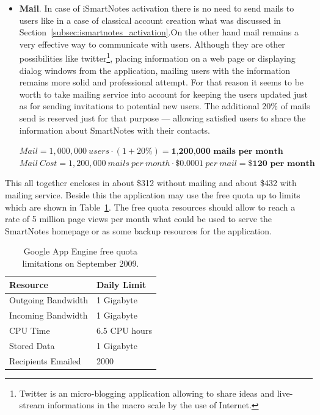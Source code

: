 \begin{itemize}
\item{\textbf{Mail}. In case of iSmartNotes activation there is no need to send mails to users like in a case of classical account creation what was discussed in Section~\ref{subsec:ismartnotes_activation}.On the other hand mail remains a very effective way to communicate with users. Although they are other possibilities like twitter\footnote{Twitter is an micro-blogging application allowing to share ideas and live-stream informations in the macro scale by the use of Internet.}, placing information on a web page or displaying dialog windows from the application, mailing users with the information remains more solid and professional attempt. For that reason it seems to be worth to take mailing service into account for keeping the users updated just as for sending invitations to potential new users. The additional 20\% of mails send is reserved just for that purpose --- allowing satisfied users to share the information about SmartNotes with their contacts.

$Mail =  1,000,000\ users\cdot (1 + 20\%) = \textbf{1,200,000\ mails\ per\ month}$ \\ 
$Mail\ Cost = 1,200,000\ mails\ per\ month \cdot \$0.0001\ per\ mail = \textbf{\$120 per\ month}$}
\end{itemize} 

This all together encloses in about \$312 without mailing and about \$432 with mailing service. Beside this the application may use the free quota up to limits which are shown in Table~\ref{tab:gae_free}. The free quota resources should allow to reach a rate of 5 million page views per month what could be used to serve the SmartNotes  homepage or as some backup resources for the application. 
\begin{table}[h]
\centering
\caption{Google App Engine free quota limitations on September 2009.}
\label{tab:gae_free}
\begin{tabular}{|l|l|} \hline \hline
\textbf{Resource} & \textbf{Daily Limit} \\ \hline \hline
Outgoing Bandwidth & 1 Gigabyte \\ \hline
Incoming Bandwidth & 1 Gigabyte \\ \hline
CPU Time & 6.5 CPU hours \\ \hline
Stored Data & 1 Gigabyte \\ \hline
Recipients Emailed & 2000 \\ \hline \hline
\end{tabular}
\end{table}

